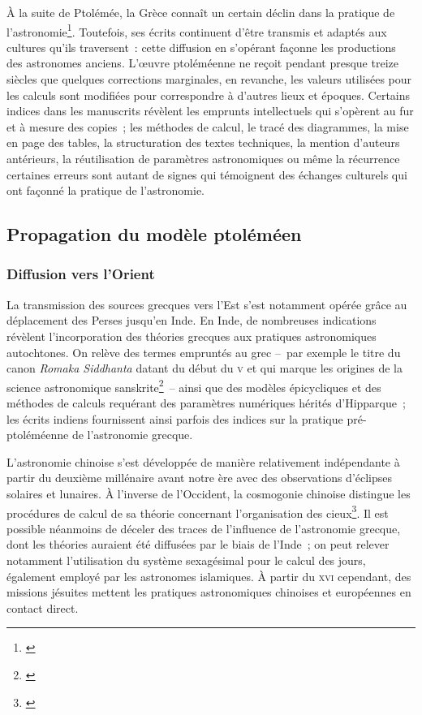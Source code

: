 \documentclass[a4paper,12pt,twoside]{book}
\newcommand{\V}{\textsc{v}\ieme{}\xspace}
\newcommand{\XVI}{\textsc{xvi}\ieme{}\xspace}
\begin{document}
À la suite de Ptolémée, la Grèce connaît un certain déclin dans la pratique de l'astronomie\footnote{\cite[p.~6]{mercierStudiesTransmissionMedieval2004}}. Toutefois, ses écrits continuent d'être transmis et adaptés aux cultures qu'ils traversent~: cette diffusion en s'opérant façonne les productions des astronomes anciens. L'œuvre ptoléméenne ne reçoit pendant presque treize siècles que quelques corrections marginales, en revanche, les valeurs utilisées pour les calculs sont modifiées pour correspondre à d'autres lieux et époques. Certains indices dans les manuscrits révèlent les emprunts intellectuels qui s'opèrent au fur et à mesure des copies~; les méthodes de calcul, le tracé des diagrammes, la mise en page des tables, la structuration des textes techniques, la mention d'auteurs antérieurs, la réutilisation de paramètres astronomiques ou même la récurrence certaines erreurs sont autant de signes qui témoignent des échanges culturels qui ont façonné la pratique de l'astronomie.

		\subsection{Propagation du modèle ptoléméen}
			\subsubsection{Diffusion vers l'Orient}
La transmission des sources grecques vers l'Est s'est notamment opérée grâce au déplacement des Perses jusqu'en Inde. En Inde, de nombreuses indications révèlent l'incorporation des théories grecques aux pratiques astronomiques autochtones. On relève des termes empruntés au grec –~par exemple le titre du canon \emph{Romaka Siddhanta} datant du début du \V et qui marque les origines de la science astronomique sanskrite\footnote{\cite[p.~7]{mercierStudiesTransmissionMedieval2004}}~– ainsi que des modèles épicycliques et des méthodes de calculs requérant des paramètres numériques hérités d’Hipparque~; les écrits indiens fournissent ainsi parfois des indices sur la pratique pré-ptoléméenne de l'astronomie grecque.

L'astronomie chinoise s'est développée de manière relativement indépendante à partir du deuxième millénaire avant notre ère avec des observations d'éclipses solaires et lunaires. À l'inverse de l'Occident, la cosmogonie chinoise distingue les procédures de calcul de sa théorie concernant l'organisation des cieux\footnote{\cite[p.~438]{selinAstronomyCulturesHistory2000}}. Il est possible néanmoins de déceler des traces de l'influence de l'astronomie grecque, dont les théories auraient été diffusées par le biais de l'Inde~; on peut relever notamment l'utilisation du système sexagésimal pour le calcul des jours, également employé par les astronomes islamiques. À partir du \XVI cependant, des missions jésuites mettent les pratiques astronomiques chinoises et européennes en contact direct.
\end{document}
